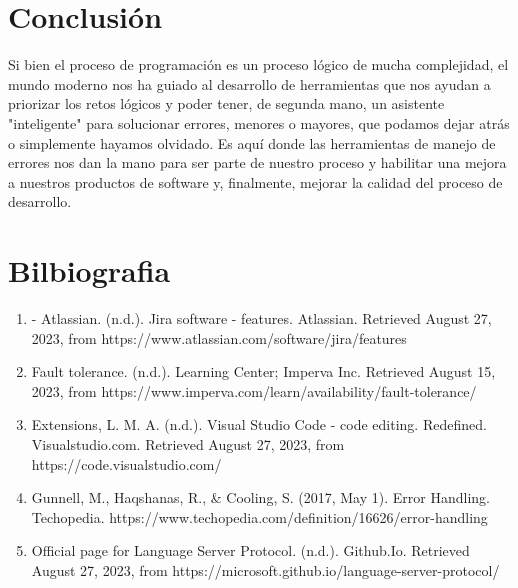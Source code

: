 \documentclass{dense_template}
\begin{document}
\section{Conclusión}
Si bien el proceso de programación es un proceso lógico de mucha complejidad, el mundo moderno nos ha guiado al desarrollo de herramientas que nos ayudan a priorizar los retos lógicos y poder tener, de segunda mano, un asistente "inteligente" para solucionar errores, menores o mayores, que podamos dejar atrás o simplemente hayamos olvidado. Es aquí donde las herramientas de manejo de errores nos dan la mano para ser parte de nuestro proceso y habilitar una mejora a nuestros productos de software y, finalmente, mejorar la calidad del proceso de desarrollo.  
\pagebreak
\section{Bilbiografia}
\sloppy
\begin{enumerate}
    \item - Atlassian. (n.d.). Jira software - features. Atlassian. Retrieved August 27, 2023, from https://www.atlassian.com/software/jira/features
    \item Fault tolerance. (n.d.). Learning Center; Imperva Inc. Retrieved August 15, 2023, from https://www.imperva.com/learn/availability/fault-tolerance/
    \item Extensions, L. M. A. (n.d.). Visual Studio Code - code editing. Redefined. Visualstudio.com. Retrieved August 27, 2023, from https://code.visualstudio.com/
    \item Gunnell, M., Haqshanas, R., \& Cooling, S. (2017, May 1). Error Handling. Techopedia. https://www.techopedia.com/definition/16626/error-handling
    \item Official page for Language Server Protocol. (n.d.). Github.Io. Retrieved August 27, 2023, from https://microsoft.github.io/language-server-protocol/
\end{enumerate}
\end{document}
